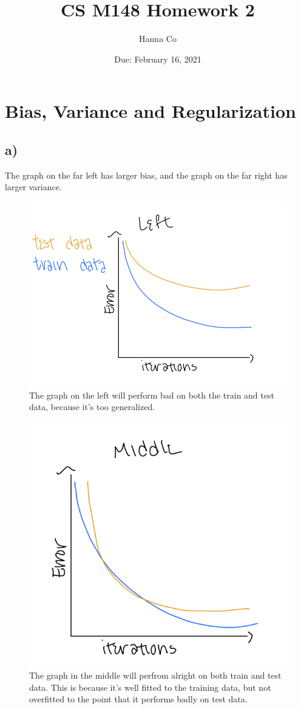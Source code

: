 \documentclass[12pt, letterpaper]{article}
\title{CS M148 Homework 2}
\author{Hanna Co}
\date{Due: February 16, 2021}
\begin{document}
\maketitle
\newpage
\section{Bias, Variance and Regularization}
\subsection*{a)} The graph on the far left has larger bias, and the graph on the far right has larger variance.
\begin{figure}[h!]
\includegraphics[scale=0.33]{./images/1a_left.jpg}
\caption*{The graph on the left will perform bad on both the train and test data, because it's too generalized.}
\end{figure}
\begin{figure}[h!]
  \includegraphics[scale=0.33]{./images/1a_middle.jpg}
\caption*{The graph in the middle will perfrom alright on both train and test data. This is because it's well fitted to the training data, but not overfitted to the point that it performs badly on test data.}
\end{figure}
\end{document}
